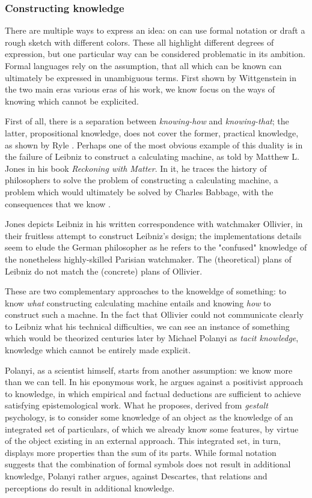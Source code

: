 \subsubsection{Constructing knowledge}
\label{subsubsec:constructing-knowledge}

There are multiple ways to express an idea: on can use formal notation or draft a rough sketch with different colors. These all highlight different degrees of expression, but one particular way can be considered problematic in its ambition. Formal languages rely on the assumption, that all which can be known can ultimately be expressed in unambiguous terms. First shown by Wittgenstein in the two main eras various eras of his work, we know focus on the ways of knowing which cannot be explicited.

First of all, there is a separation between \emph{knowing-how} and \emph{knowing-that}; the latter, propositional knowledge, does not cover the former, practical knowledge, as shown by Ryle \citep{ryle_concept_1951}. Perhaps one of the most obvious example of this duality is in the failure of Leibniz to construct a calculating machine, as told by Matthew L. Jones in his book \emph{Reckoning with Matter}. In it, he traces the history of philosophers to solve the problem of constructing a calculating machine, a problem which would ultimately be solved by Charles Babbage, with the consequences that we know \citep{jones_reckoning_2016}.

Jones depicts Leibniz in his written correspondence with watchmaker Ollivier, in their fruitless attempt to construct Leibniz's design; the implementations details seem to elude the German philosopher as he refers to the "confused" knowledge of the nonetheless highly-skilled Parisian watchmaker. The (theoretical) plans of Leibniz do not match the (concrete) plans of Ollivier.

These are two complementary approaches to the knoweldge of something: to know \emph{what} constructing calculating machine entails and knowing \emph{how} to construct such a machne. In the fact that Ollivier could not communicate clearly to Leibniz what his technical difficulties, we can see an instance of something which would be theorized centuries later by Michael Polanyi as \emph{tacit knowledge}, knowledge which cannot be entirely made explicit.

Polanyi, as a scientist himself, starts from another assumption: we know more than we can tell. In his eponymous work, he argues against a positivist approach to knowledge, in which empirical and factual deductions are sufficient to achieve satisfying epistemological work. What he proposes, derived from \emph{gestalt} psychology, is to consider some knowledge of an object as the knowledge of an integrated set of particulars, of which we already know some features, by virtue of the object existing in an external approach. This integrated set, in turn, displays more properties than the sum of its parts. While formal notation suggests that the combination of formal symbols does not result in additional knowledge, Polanyi rather argues, against Descartes, that relations and perceptions do result in additional knowledge.

